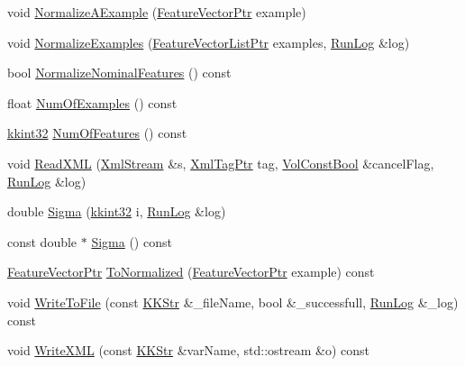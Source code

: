\begin{DoxyCompactItemize}
\item 
void \hyperlink{class_k_k_m_l_l_1_1_normalization_parms_a2724703ce1a35c8de04b6e8746986a0d}{Normalize\+A\+Example} (\hyperlink{namespace_k_k_m_l_l_a0c5df3d48f45926fbc4fee04f5e3bc04}{Feature\+Vector\+Ptr} example)
\item 
void \hyperlink{class_k_k_m_l_l_1_1_normalization_parms_ad75dc1dece1b375d27706a44ab17c77f}{Normalize\+Examples} (\hyperlink{namespace_k_k_m_l_l_acf2ba92a3cf03e2b19674b24ff488ef6}{Feature\+Vector\+List\+Ptr} examples, \hyperlink{class_k_k_b_1_1_run_log}{Run\+Log} \&log)
\item 
bool \hyperlink{class_k_k_m_l_l_1_1_normalization_parms_abf9678122afbac33e978ec16b85939b4}{Normalize\+Nominal\+Features} () const 
\item 
float \hyperlink{class_k_k_m_l_l_1_1_normalization_parms_a30b1eb1befdc5939f926fc5a25f682db}{Num\+Of\+Examples} () const 
\item 
\hyperlink{namespace_k_k_b_a8fa4952cc84fda1de4bec1fbdd8d5b1b}{kkint32} \hyperlink{class_k_k_m_l_l_1_1_normalization_parms_a2db85927191c7cc596d39aa8824f41cc}{Num\+Of\+Features} () const 
\item 
void \hyperlink{class_k_k_m_l_l_1_1_normalization_parms_afa2edc33ed1435e6020c4deea4e3058b}{Read\+X\+ML} (\hyperlink{class_k_k_b_1_1_xml_stream}{Xml\+Stream} \&s, \hyperlink{namespace_k_k_b_a9253a3ea8a5da18ca82be4ca2b390ef0}{Xml\+Tag\+Ptr} tag, \hyperlink{namespace_k_k_b_a7d390f568e2831fb76b86b56c87bf92f}{Vol\+Const\+Bool} \&cancel\+Flag, \hyperlink{class_k_k_b_1_1_run_log}{Run\+Log} \&log)
\item 
double \hyperlink{class_k_k_m_l_l_1_1_normalization_parms_a040a1c6dfb06dfdedacc45860d66c6b9}{Sigma} (\hyperlink{namespace_k_k_b_a8fa4952cc84fda1de4bec1fbdd8d5b1b}{kkint32} i, \hyperlink{class_k_k_b_1_1_run_log}{Run\+Log} \&log)
\item 
const double $\ast$ \hyperlink{class_k_k_m_l_l_1_1_normalization_parms_a7c9642f0da7c357779b5b6cf4a55aa1b}{Sigma} () const 
\item 
\hyperlink{namespace_k_k_m_l_l_a0c5df3d48f45926fbc4fee04f5e3bc04}{Feature\+Vector\+Ptr} \hyperlink{class_k_k_m_l_l_1_1_normalization_parms_a478e982ac6811589fe4b17f51bebeba5}{To\+Normalized} (\hyperlink{namespace_k_k_m_l_l_a0c5df3d48f45926fbc4fee04f5e3bc04}{Feature\+Vector\+Ptr} example) const 
\item 
void \hyperlink{class_k_k_m_l_l_1_1_normalization_parms_aa038e4c1b5c68225d1936f30e8c79346}{Write\+To\+File} (const \hyperlink{class_k_k_b_1_1_k_k_str}{K\+K\+Str} \&\+\_\+file\+Name, bool \&\+\_\+successfull, \hyperlink{class_k_k_b_1_1_run_log}{Run\+Log} \&\+\_\+log) const 
\item 
void \hyperlink{class_k_k_m_l_l_1_1_normalization_parms_a19c533cffc426743b90b4b41d3eb393c}{Write\+X\+ML} (const \hyperlink{class_k_k_b_1_1_k_k_str}{K\+K\+Str} \&var\+Name, std\+::ostream \&o) const 
\end{DoxyCompactItemize}

